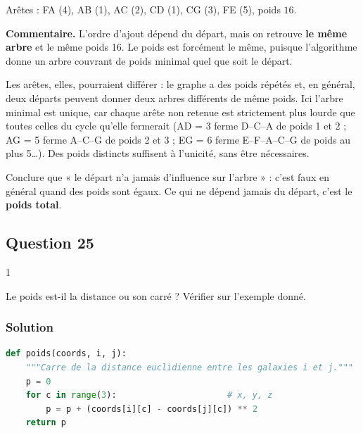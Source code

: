 \documentclass[11pt,a4paper]{article}
\newcommand{\equationajustee}[1]{%
  \sbox{\boiteequation}{$\displaystyle #1$}%
  \ifdim\wd\boiteequation>\linewidth
    \[\resizebox{\linewidth}{!}{\usebox{\boiteequation}}\]%
  \else
    \[#1\]%
  \fi}
\begin{document}
\equationajustee{\boxed{\text{Ordre d'ajout : F, A, B, C, D, G, E}}}

Arêtes : FA (4), AB (1), AC (2), CD (1), CG (3), FE (5), poids \(16\).

\textbf{Commentaire.} L'ordre d'ajout dépend du départ, mais on retrouve \textbf{le même arbre} et le même poids 16. Le poids est forcément le même, puisque l'algorithme donne un arbre couvrant de poids minimal quel que soit le départ.

Les arêtes, elles, pourraient différer : le graphe a des poids répétés et, en général, deux départs peuvent donner deux arbres différents de même poids. Ici l'arbre minimal est unique, car chaque arête non retenue est strictement plus lourde que toutes celles du cycle qu'elle fermerait (AD = 3 ferme D--C--A de poids 1 et 2 ; AG = 5 ferme A--C--G de poids 2 et 3 ; EG = 6 ferme E--F--A--C--G de poids au plus 5\ldots). Des poids distincts suffisent à l'unicité, sans être nécessaires.

\begin{piege}

Conclure que « le départ n'a jamais d'influence sur l'arbre » : c'est faux en général quand des poids sont égaux. Ce qui ne dépend jamais du départ, c'est le \textbf{poids total}.

\end{piege}

\hypertarget{question-25}{%
\subsection{Question 25}\label{question-25}}

\begin{indication}{1}

Le poids est-il la distance ou son carré ? Vérifier sur l'exemple donné.

\end{indication}

\hypertarget{solution-24}{%
\subsubsection{Solution}\label{solution-24}}

\begin{lstlisting}[language=Python]
def poids(coords, i, j):
    """Carre de la distance euclidienne entre les galaxies i et j."""
    p = 0
    for c in range(3):                      # x, y, z
        p = p + (coords[i][c] - coords[j][c]) ** 2
    return p
\end{lstlisting}
\end{document}
